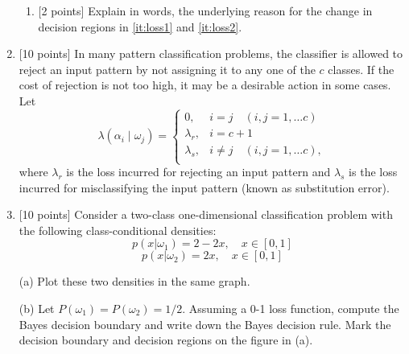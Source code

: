 \documentclass[11pt]{article}
\newcommand{\myvector}[1]{\mbox{\boldmath$#1$}}
\begin{document}
\begin{enumerate}
\begin{enumerate}
\item{[2 points]} Explain in words, the underlying reason for the change in decision regions in \ref{it:loss1} and \ref{it:loss2}. 
\end{enumerate}

\item{[10 points]} In many pattern classification problems, the classifier
is allowed to reject an input pattern by not assigning it to any one of the
$c$ classes. If the cost of rejection is not too high, it may be a desirable
action in some cases. Let
\[
\lambda(\alpha_i\mid \omega_j) = 
\begin{cases}
0, & i = j \quad (i,j = 1,\ldots c)\\
\lambda_r, & i = c+1 \\
\lambda_s, & i \ne j \quad (i,j = 1,\ldots c),\\
\end{cases}
\]
where $\lambda_r$ is the loss incurred for rejecting an input pattern and 
$\lambda_s$ is the loss incurred for misclassifying the input pattern (known
as substitution error). 


\item{[10 points]} Consider a two-class one-dimensional
classification problem with the following class-conditional
densities:
\[
p(x|\omega_1) = 2 - 2x, \quad x \in [0,1]
\]
\[
p(x|\omega_2) = 2x, \quad x \in [0,1]
\]

(a) Plot these two densities in the same graph.

(b) Let $P(\omega_1) = P(\omega_2) = 1/2$. Assuming a 0-1 loss function, compute the Bayes decision boundary and write down the Bayes decision rule. Mark the decision boundary and decision regions on the figure in (a).


\end{enumerate}
\end{document}
